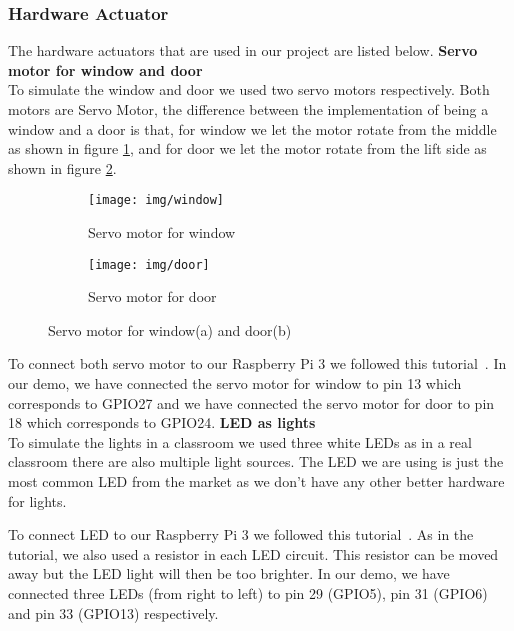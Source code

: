 \documentclass[runningheads]{llncs}
\begin{document}
\subsubsection{Hardware Actuator}\hfill
\label{hard_imp:actuator}
\newline
The hardware actuators that are used in our project are listed below.
\newline
\textbf{Servo motor for window and door~\cite{m_actuator}}\\
To simulate the window and door we used two servo motors respectively. Both motors are Servo Motor, the difference between the implementation of being a window and a door is that, for window we let the motor rotate from the middle as shown in figure \ref{pic:window}, and for door we let the motor rotate from the lift side as shown in figure \ref{pic:door}. 
\begin{figure}[H]
\centering
\begin{subfigure}{.5\textwidth}
  \centering
  \texttt{[image: img/window]}
  \caption{Servo motor for window}
  \label{pic:window}
\end{subfigure}%
\begin{subfigure}{.5\textwidth}
  \centering
  \texttt{[image: img/door]}
  \caption{Servo motor for door}
  \label{pic:door}
\end{subfigure}
\caption{Servo motor for window(a) and door(b)}
\label{pic:sm}
\end{figure}

To connect both servo motor to our Raspberry Pi 3 we followed this tutorial~\cite{m_tutorial}. In our demo, we have connected the servo motor for window to pin 13 which corresponds to GPIO27 and we have connected the servo motor for door to pin 18 which corresponds to GPIO24.
\newline
\textbf{LED as lights}\\
To simulate the lights in a classroom we used three white LEDs as in a real classroom there are also multiple light sources. The LED we are using is just the most common LED from the market as we don’t have any other better hardware for lights.

To connect LED to our Raspberry Pi 3 we followed this tutorial~\cite{led_tutorial}. As in the tutorial, we also used a resistor in each LED circuit. This resistor can be moved away but the LED light will then be too brighter. In our demo, we have connected three LEDs (from right to left) to pin 29 (GPIO5), pin 31 (GPIO6) and pin 33 (GPIO13) respectively.
\end{document}
